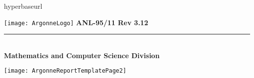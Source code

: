 %
%

hyperbaseurl

\makeindex

\def\design{\medskip \noindent Design Issue:\begin{em}}
\def\enddesign{\end{em} \medskip}


\def\shortintro{false}

\usepackage{fancyhdr,lastpage}
\pagestyle{fancy}





\pagestyle{empty}
\hspace{-.65in}\texttt{[image: ArgonneLogo]}
\hfill  {\large {\bf ANL-95/11 Rev 3.12}}

\vspace*{2in}
\vspace*{8pt}
\hrule
\vspace*{8pt}

\vspace*{1in}
\noindent \\
{\Large {\bf Mathematics and Computer Science Division}}

\vspace*{10pt}


\vspace*{20pt}



\newpage
{}
\centerline{\texttt{[image: ArgonneReportTemplatePage2]}}
\restoregeometry
\newpage


